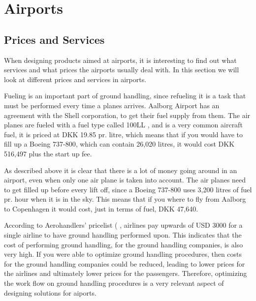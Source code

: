 \chapter{Airports}
\section{Prices and Services}
When designing products aimed at airports, it is interesting to find out what services and what prices the airports usually deal with. In this section we will look at different prices and services in airports.


Fueling is an important part of ground handling, since refueling it is a task that must be performed every time a planes arrives. Aalborg Airport has an agreement with the Shell corporation, to get their fuel supply from them. The air planes are fueled with a fuel type called 100LL \cite{iaopa_fuelprices}, and is a very common aircraft fuel, it is priced at DKK 19.85 pr. litre, which means that if you would have to fill up a Boeing 737-800, which can contain 26,020 litres\cite{737_specs}, it would cost DKK 516,497 plus the start up fee.

As described above it is clear that there is a lot of money going around in an airport, even when only one air plane is taken into account. The air planes need to get filled up before every lift off, since a Boeing 737-800 uses 3,200 litres of fuel pr. hour when it is in the sky. This means that if you where to fly from Aalborg to Copenhagen it would cost, just in terms of fuel, DKK 47,640.


According to Aerohandlers' pricelist (%
, airlines pay upwards of USD 3000 for a single airline to have ground handling performed upon. This indicates that the cost of performing ground handling, for the ground handling companies, is also very high. If you were able to optimize ground handling procedures, then costs for the ground handling companies could be reduced, leading to lower prices for the airlines and ultimately lower prices for the passengers. Therefore, optimizing the work flow on ground handling procedures is a very relevant aspect of designing solutions for aiports.